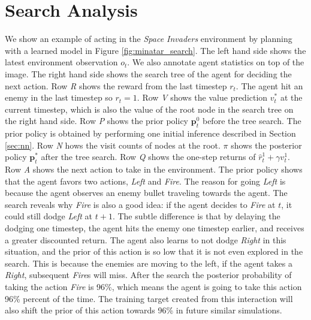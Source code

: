 
\section{Search Analysis}
We show an example of \moozi acting in the \textit{Space Invaders} environment by planning with a learned model in Figure \ref{fig:minatar_search}.
The left hand side shows the latest environment observation $o_t$.
We also annotate agent statistics on top of the image.
The right hand side shows the search tree of the agent for deciding the next action.
Row \textit{R} shows the reward from the last timestep $r_t$.
The agent hit an enemy in the last timestep so $r_t = 1$.
Row \textit{V} shows the value prediction $v_t^{*}$ at the current timestep, which is also the value of the root node in the search tree on the right hand side.
Row \textit{P} shows the prior policy $\mathbf{p}^0_t$ before the tree search.
The prior policy is obtained by performing one initial inference described in Section \ref{sec:nn}.
Row \textit{N} hows the visit counts of nodes at the root.
\(\pi\) shows the posterior policy $\mathbf{p}^*_t$ after the tree search.
Row \textit{Q} shows the one-step returns of  \(\hat{r}_t^1 + \gamma v_t^1\).
Row \textit{A} shows the next action to take in the environment.
The prior policy shows that the agent favors two actions, \textit{Left} and \textit{Fire}.
The reason for going \textit{Left} is because the agent observes an enemy bullet traveling towards the agent.
The search reveals why \textit{Fire} is also a good idea: if the agent decides to \textit{Fire} at $t$, it could still dodge \textit{Left} at $t+1$.
The subtle difference is that by delaying the dodging one timestep, the agent hits the enemy one timestep earlier, and receives a greater discounted return.
The agent also learns to not dodge \textit{Right} in this situation, and the prior of this action is so low that it is not even explored in the search.
This is because the enemies are moving to the left, if the agent takes a \textit{Right}, subsequent \textit{Fire}s will miss.
After the search the posterior probability of taking the action \textit{Fire} is 96\%, which means the agent is going to take this action 96\% percent of the time.
The training target created from this interaction will also shift the prior of this action towards 96\% in future similar simulations.


